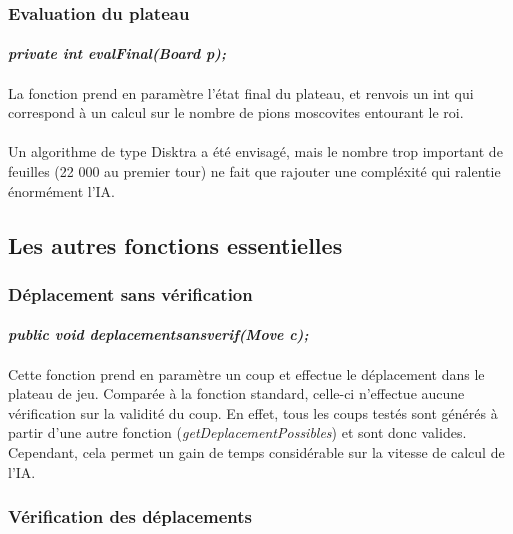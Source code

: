 \documentclass[11pt]{article} %
\begin{document}
\subsubsection{Evaluation du plateau}
\paragraph{}
\textit{\textbf{private int evalFinal(Board p);}}
\paragraph{}
La fonction prend en paramètre l'état final du plateau, et renvois un int qui correspond à un calcul sur le nombre de pions moscovites entourant le roi.
\paragraph{}
Un algorithme de type Disktra a été envisagé, mais le nombre trop important de feuilles (22 000 au premier tour) ne fait que rajouter une compléxité qui ralentie énormément l'IA.

\subsection{Les autres fonctions essentielles}

\subsubsection{Déplacement sans vérification}
\paragraph{}
\textit{\textbf{public void deplacementsansverif(Move c);}}
\paragraph{}
Cette fonction prend en paramètre un coup et effectue le déplacement dans le plateau de jeu. Comparée à la fonction standard, celle-ci n'effectue aucune vérification sur la validité du coup. En effet, tous les coups testés sont générés à partir d'une autre fonction (\textit{getDeplacementPossibles}) et sont donc valides. Cependant, cela permet un gain de temps considérable sur la vitesse de calcul de l'IA.

\subsubsection{Vérification des déplacements}
\end{document}
